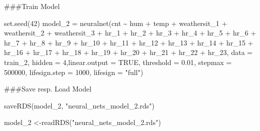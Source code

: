 \documentclass[
]{article}
\newenvironment{Shaded}{\begin{snugshade}}{\end{snugshade}}
\newcommand{\AttributeTok}[1]{\textcolor[rgb]{0.77,0.63,0.00}{#1}}
\newcommand{\ConstantTok}[1]{\textcolor[rgb]{0.00,0.00,0.00}{#1}}
\newcommand{\DecValTok}[1]{\textcolor[rgb]{0.00,0.00,0.81}{#1}}
\newcommand{\FloatTok}[1]{\textcolor[rgb]{0.00,0.00,0.81}{#1}}
\newcommand{\FunctionTok}[1]{\textcolor[rgb]{0.00,0.00,0.00}{#1}}
\newcommand{\NormalTok}[1]{#1}
\newcommand{\OtherTok}[1]{\textcolor[rgb]{0.56,0.35,0.01}{#1}}
\newcommand{\SpecialCharTok}[1]{\textcolor[rgb]{0.00,0.00,0.00}{#1}}
\newcommand{\StringTok}[1]{\textcolor[rgb]{0.31,0.60,0.02}{#1}}
\begin{document}
\#\#\#Train Model

\begin{Shaded}
\begin{Highlighting}[]
\FunctionTok{set.seed}\NormalTok{(}\DecValTok{42}\NormalTok{)}
\NormalTok{model\_2 }\OtherTok{=} \FunctionTok{neuralnet}\NormalTok{(cnt }\SpecialCharTok{\textasciitilde{}}\NormalTok{ hum }\SpecialCharTok{+}\NormalTok{ temp }\SpecialCharTok{+}\NormalTok{ weathersit\_1 }\SpecialCharTok{+}\NormalTok{ weathersit\_2 }\SpecialCharTok{+}\NormalTok{ weathersit\_3 }\SpecialCharTok{+}\NormalTok{ hr\_1 }\SpecialCharTok{+}\NormalTok{ hr\_2 }\SpecialCharTok{+}\NormalTok{ hr\_3 }\SpecialCharTok{+}\NormalTok{ hr\_4 }\SpecialCharTok{+}\NormalTok{ hr\_5 }\SpecialCharTok{+}\NormalTok{ hr\_6 }\SpecialCharTok{+}\NormalTok{ hr\_7 }\SpecialCharTok{+}\NormalTok{ hr\_8 }\SpecialCharTok{+}\NormalTok{ hr\_9 }\SpecialCharTok{+}\NormalTok{ hr\_10 }\SpecialCharTok{+}\NormalTok{ hr\_11 }\SpecialCharTok{+}\NormalTok{ hr\_12 }\SpecialCharTok{+}\NormalTok{ hr\_13 }\SpecialCharTok{+}\NormalTok{ hr\_14 }\SpecialCharTok{+}\NormalTok{ hr\_15 }\SpecialCharTok{+}\NormalTok{ hr\_16 }\SpecialCharTok{+}\NormalTok{ hr\_17 }\SpecialCharTok{+}\NormalTok{ hr\_18 }\SpecialCharTok{+}\NormalTok{ hr\_19 }\SpecialCharTok{+}\NormalTok{ hr\_20 }\SpecialCharTok{+}\NormalTok{ hr\_21 }\SpecialCharTok{+}\NormalTok{ hr\_22 }\SpecialCharTok{+}\NormalTok{ hr\_23, }\AttributeTok{data =}\NormalTok{ train\_2, }\AttributeTok{hidden =} \DecValTok{4}\NormalTok{,}\AttributeTok{linear.output =} \ConstantTok{TRUE}\NormalTok{, }\AttributeTok{threshold =} \FloatTok{0.01}\NormalTok{, }\AttributeTok{stepmax =} \DecValTok{500000}\NormalTok{, }\AttributeTok{lifesign.step =} \DecValTok{1000}\NormalTok{, }\AttributeTok{lifesign =} \StringTok{"full"}\NormalTok{)}
\end{Highlighting}
\end{Shaded}

\#\#\#Save resp. Load Model

\begin{Shaded}
\begin{Highlighting}[]
\FunctionTok{saveRDS}\NormalTok{(model\_2, }\StringTok{"neural\_nets\_model\_2.rds"}\NormalTok{)}
\end{Highlighting}
\end{Shaded}

\begin{Shaded}
\begin{Highlighting}[]
\NormalTok{model\_2 }\OtherTok{\textless{}{-}}\FunctionTok{readRDS}\NormalTok{(}\StringTok{"neural\_nets\_model\_2.rds"}\NormalTok{)}
\end{Highlighting}
\end{Shaded}
\end{document}
